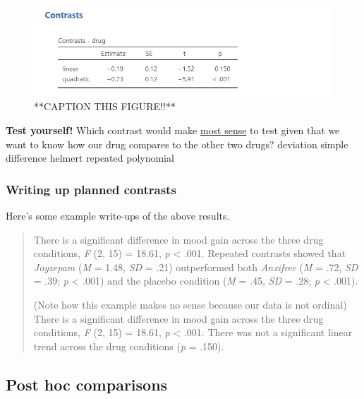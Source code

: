 \documentclass[
]{book}
\begin{document}
\begin{figure}

{\centering \includegraphics[width=1\linewidth]{images/04_one-way-anova/contrasts_polynomial} 

}

\caption{**CAPTION THIS FIGURE!!**}\label{fig:unnamed-chunk-13}
\end{figure}

\textbf{Test yourself!} Which contrast would make \underline{most sense} to test given that we want to know how our drug compares to the other two drugs? deviation simple difference helmert repeated polynomial

\hypertarget{writing-up-planned-contrasts}{%
\subsubsection{Writing up planned contrasts}\label{writing-up-planned-contrasts}}

Here's some example write-ups of the above results.

\begin{quote}
There is a significant difference in mood gain across the three drug conditions, \emph{F} (2, 15) = 18.61, \emph{p} \textless{} .001. Repeated contrasts showed that \emph{Joyzepam} (\emph{M} = 1.48, \emph{SD} = .21) outperformed both \emph{Anxifree} (\emph{M} = .72, \emph{SD} = .39; \emph{p} \textless{} .001) and the placebo condition (\emph{M} = .45, \emph{SD} = .28; \emph{p} \textless{} .001).

(Note how this example makes no sense because our data is not ordinal) There is a significant difference in mood gain across the three drug conditions, \emph{F} (2, 15) = 18.61, \emph{p} \textless{} .001. There was not a significant linear trend across the drug conditions (\emph{p} = .150).
\end{quote}

\hypertarget{post-hoc-comparisons}{%
\subsection{Post hoc comparisons}\label{post-hoc-comparisons}}
\end{document}
